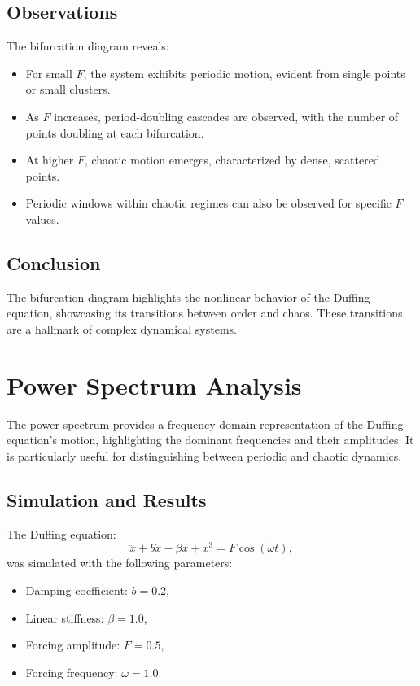 \documentclass[11pt]{article}
\begin{document}
\subsection*{Observations}
The bifurcation diagram reveals:
\begin{itemize}
    \item For small \(F\), the system exhibits periodic motion, evident from single points or small clusters.
    \item As \(F\) increases, period-doubling cascades are observed, with the number of points doubling at each bifurcation.
    \item At higher \(F\), chaotic motion emerges, characterized by dense, scattered points.
    \item Periodic windows within chaotic regimes can also be observed for specific \(F\) values.
\end{itemize}

\subsection*{Conclusion}
The bifurcation diagram highlights the nonlinear behavior of the Duffing equation, showcasing its transitions between order and chaos. These transitions are a hallmark of complex dynamical systems.

\section*{Power Spectrum Analysis}
The power spectrum provides a frequency-domain representation of the Duffing equation's motion, highlighting the dominant frequencies and their amplitudes. It is particularly useful for distinguishing between periodic and chaotic dynamics.

\subsection*{Simulation and Results}
The Duffing equation:
\[
\ddot{x} + b \dot{x} - \beta x + x^3 = F \cos(\omega t),
\]
was simulated with the following parameters:
\begin{itemize}
    \item Damping coefficient: \(b = 0.2\),
    \item Linear stiffness: \(\beta = 1.0\),
    \item Forcing amplitude: \(F = 0.5\),
    \item Forcing frequency: \(\omega = 1.0\).
\end{itemize}
\end{document}
